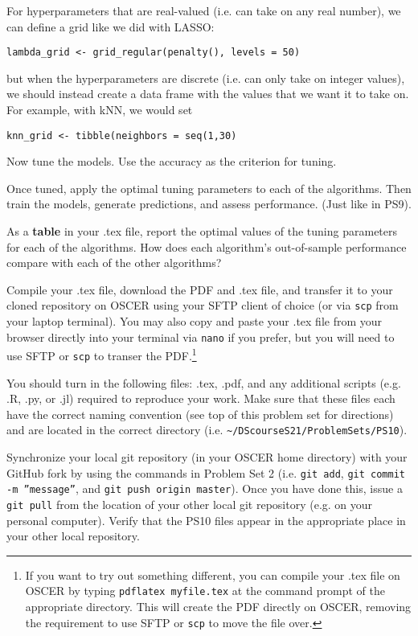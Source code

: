 \documentclass[12pt,english]{exam}
\begin{document}
\begin{questions}
For hyperparameters that are real-valued (i.e. can take on any real number), we can define a grid like we did with LASSO:

\texttt{lambda\_grid <- grid\_regular(penalty(), levels = 50)}

\bigskip
but when the hyperparameters are discrete (i.e. can only take on integer values), we should instead create a data frame with the values that we want it to take on. For example, with kNN, we would set

\texttt{knn\_grid <- tibble(neighbors = seq(1,30)}

\question Now tune the models. Use the accuracy as the criterion for tuning. %

\question Once tuned, apply the optimal tuning parameters to each of the algorithms. Then train the models, generate predictions, and assess performance. (Just like in PS9).

\question As a \textbf{table} in your .tex file, report the optimal values of the tuning parameters for each of the algorithms. How does each algorithm's out-of-sample performance compare with each of the other algorithms?

\question Compile your .tex file, download the PDF and .tex file, and transfer it to your cloned repository on OSCER using your SFTP client of choice (or via \texttt{scp} from your laptop terminal). You may also copy and paste your .tex file from your browser directly into your terminal via \texttt{nano} if you prefer, but you will need to use SFTP or \texttt{scp} to transer the PDF.\footnote{If you want to try out something different, you can compile your .tex file on OSCER by typing \texttt{pdflatex myfile.tex} at the command prompt of the appropriate directory. This will create the PDF directly on OSCER, removing the requirement to use SFTP or \texttt{scp} to move the file over.}

\question You should turn in the following files: .tex, .pdf, and any additional scripts (e.g. .R, .py, or .jl) required to reproduce your work.  Make sure that these files each have the correct naming convention (see top of this problem set for directions) and are located in the correct directory (i.e. \texttt{\textasciitilde/DScourseS21/ProblemSets/PS10}).

\question Synchronize your local git repository (in your OSCER home directory) with your GitHub fork by using the commands in Problem Set 2 (i.e. \texttt{git add}, \texttt{git commit -m ''message''}, and \texttt{git push origin master}). Once you have done this, issue a \texttt{git pull} from the location of your other local git repository (e.g. on your personal computer). Verify that the PS10 files appear in the appropriate place in your other local repository.

\end{questions}
\end{document}
